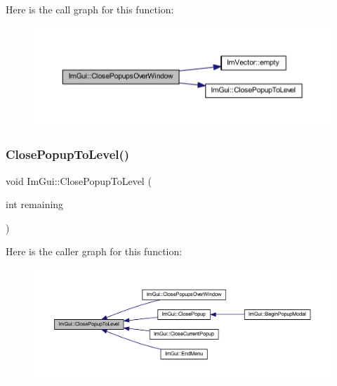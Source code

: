 Here is the call graph for this function\+:
\nopagebreak
\begin{figure}[H]
\begin{center}
\leavevmode
\includegraphics[width=350pt]{namespace_im_gui_a2febc7edd279491870160d390fd6e2e5_cgraph}
\end{center}
\end{figure}
\mbox{\label{namespace_im_gui_abaa7a1d867e9f6fbb8c7c20bf8344a8b}} 
\subsubsection{\texorpdfstring{Close\+Popup\+To\+Level()}{ClosePopupToLevel()}}
{\footnotesize\ttfamily void Im\+Gui\+::\+Close\+Popup\+To\+Level (\begin{DoxyParamCaption}\item[{int}]{remaining }\end{DoxyParamCaption})}

Here is the caller graph for this function\+:
\nopagebreak
\begin{figure}[H]
\begin{center}
\leavevmode
\includegraphics[width=350pt]{namespace_im_gui_abaa7a1d867e9f6fbb8c7c20bf8344a8b_icgraph}
\end{center}
\end{figure}
\mbox{\label{namespace_im_gui_acd027458d7a062d3d3073339454624e3}} 
